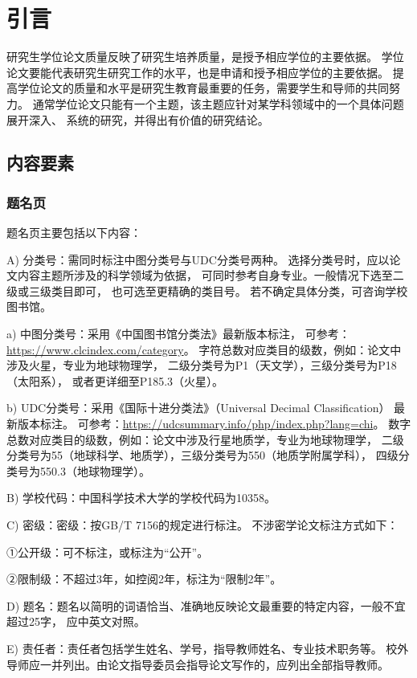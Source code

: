 
\chapter{引言}

研究生学位论文质量反映了研究生培养质量，是授予相应学位的主要依据。
学位论文要能代表研究生研究工作的水平，也是申请和授予相应学位的主要依据。
提高学位论文的质量和水平是研究生教育最重要的任务，需要学生和导师的共同努力。
通常学位论文只能有一个主题，该主题应针对某学科领域中的一个具体问题展开深入、
系统的研究，并得出有价值的研究结论。


\section{内容要素}

\subsection{题名页}

题名页主要包括以下内容：

A) 分类号：需同时标注中图分类号与UDC分类号两种。
选择分类号时，应以论文内容主题所涉及的科学领域为依据，
可同时参考自身专业。一般情况下选至二级或三级类目即可，
也可选至更精确的类目号。
若不确定具体分类，可咨询学校图书馆。

a) 中图分类号：采用《中国图书馆分类法》最新版本标注，
可参考：\url{https://www.clcindex.com/category}。
字符总数对应类目的级数，例如：论文中涉及火星，专业为地球物理学，
二级分类号为P1（天文学），三级分类号为P18（太阳系），
或者更详细至P185.3（火星）。

b) UDC分类号：采用《国际十进分类法》（Universal Decimal
Classification） 最新版本标注。
可参考：\url{https://udcsummary.info/php/index.php?lang=chi}。
数字总数对应类目的级数，例如：论文中涉及行星地质学，专业为地球物理学，
二级分类号为55（地球科学、地质学），三级分类号为550（地质学附属学科），
四级分类号为550.3（地球物理学）。

B) 学校代码：中国科学技术大学的学校代码为10358。

C) 密级：密级：按GB/T 7156的规定进行标注。
不涉密学论文标注方式如下：

①公开级：可不标注，或标注为“公开”。

②限制级：不超过3年，如控阅2年，标注为“限制2年”。

D) 题名：题名以简明的词语恰当、准确地反映论文最重要的特定内容，一般不宜超过25字，
应中英文对照。

E) 责任者：责任者包括学生姓名、学号，指导教师姓名、专业技术职务等。
校外导师应一并列出。由论文指导委员会指导论文写作的，应列出全部指导教师。

